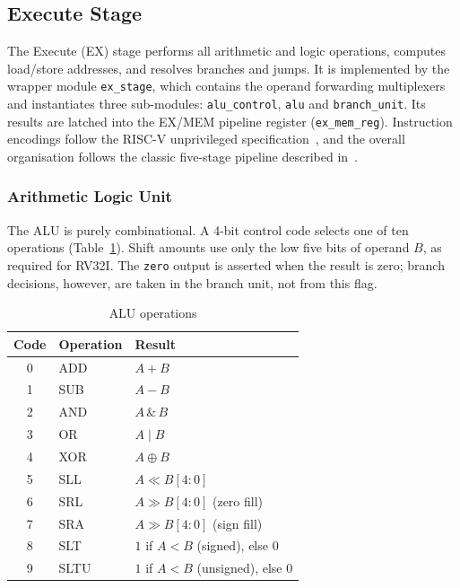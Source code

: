 \subsection{Execute Stage}
\label{sec:ex_stage}

The Execute (EX) stage performs all arithmetic and logic operations, computes
load/store addresses, and resolves branches and jumps. It is implemented by the
wrapper module \texttt{ex\_stage}, which contains the operand forwarding
multiplexers and instantiates three sub-modules: \texttt{alu\_control},
\texttt{alu} and \texttt{branch\_unit}. Its results are latched into the
EX/MEM pipeline register (\texttt{ex\_mem\_reg}). Instruction encodings follow
the RISC-V unprivileged specification~\cite{kapish_riscv_isa}, and the overall
organisation follows the classic five-stage pipeline described
in~\cite{kapish_patterson_riscv, kapish_harris_riscv}.

\subsubsection{Arithmetic Logic Unit}
The ALU is purely combinational. A 4-bit control code selects one of ten
operations (Table~\ref{tab:alu_ops}). Shift amounts use only the low five bits
of operand $B$, as required for RV32I. The \texttt{zero} output is asserted
when the result is zero; branch decisions, however, are taken in the branch
unit, not from this flag.

\begin{table}[htbp]
\caption{ALU operations}
\label{tab:alu_ops}
\centering
\begin{tabular}{|c|l|l|}
\hline
\textbf{Code} & \textbf{Operation} & \textbf{Result} \\
\hline
0 & ADD  & $A + B$ \\
1 & SUB  & $A - B$ \\
2 & AND  & $A \,\&\, B$ \\
3 & OR   & $A \mid B$ \\
4 & XOR  & $A \oplus B$ \\
5 & SLL  & $A \ll B[4{:}0]$ \\
6 & SRL  & $A \gg B[4{:}0]$ (zero fill) \\
7 & SRA  & $A \gg B[4{:}0]$ (sign fill) \\
8 & SLT  & $1$ if $A < B$ (signed), else $0$ \\
9 & SLTU & $1$ if $A < B$ (unsigned), else $0$ \\
\hline
\end{tabular}
\end{table}

